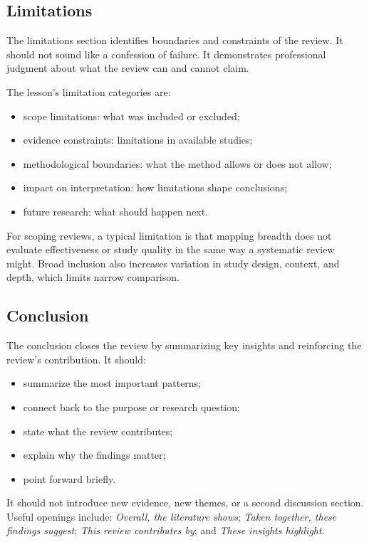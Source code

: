 \documentclass[10pt,letterpaper]{article}
\begin{document}
\subsection{Limitations}

The limitations section identifies boundaries and constraints of the review. It should not sound like a confession of failure. It demonstrates professional judgment about what the review can and cannot claim.

The lesson's limitation categories are:

\begin{itemize}
\item scope limitations: what was included or excluded;
\item evidence constraints: limitations in available studies;
\item methodological boundaries: what the method allows or does not allow;
\item impact on interpretation: how limitations shape conclusions;
\item future research: what should happen next.
\end{itemize}

For scoping reviews, a typical limitation is that mapping breadth does not evaluate effectiveness or study quality in the same way a systematic review might. Broad inclusion also increases variation in study design, context, and depth, which limits narrow comparison.

\subsection{Conclusion}

The conclusion closes the review by summarizing key insights and reinforcing the review's contribution. It should:

\begin{itemize}
\item summarize the most important patterns;
\item connect back to the purpose or research question;
\item state what the review contributes;
\item explain why the findings matter;
\item point forward briefly.
\end{itemize}

It should not introduce new evidence, new themes, or a second discussion section. Useful openings include: \emph{Overall, the literature shows}; \emph{Taken together, these findings suggest}; \emph{This review contributes by}; and \emph{These insights highlight}.
\end{document}
